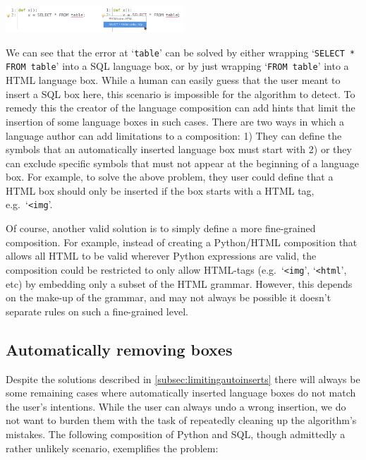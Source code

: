 \documentclass[sigplan,screen]{acmart}\settopmatter{printfolios=true,printccs=false,printacmref=false}
\newcommand{\qtt}[1]{`\texttt{#1}'\xspace}
\begin{document}
\begin{center}
\includegraphics[width=0.5\textwidth]{images/auto_html.png}
\end{center}

We can see that the error at \qtt{table} can be solved by either wrapping
\qtt{SELECT * FROM table} into a SQL language box, or by just wrapping
\qtt{FROM table} into a HTML language box. While a human can easily guess
that the user meant to insert a SQL box here, this scenario is impossible for the
algorithm to detect. To remedy this the creator of the language composition can add hints that
limit the insertion of some language boxes in such cases.   There are two ways in which
a language author can add limitations to a composition: 1) They can define
the symbols that an automatically inserted language box must start with 2)
or they can exclude specific symbols that must not appear at the beginning of a
language box. For example, to solve the above problem, they user could define
that a HTML box should only be inserted if the box starts with a HTML tag,
e.g.~\qtt{<img}.

Of course, another valid solution is to simply define a more
fine-grained composition. For example, instead of creating a Python/HTML
composition that allows all HTML to be valid wherever Python expressions are
valid, the composition could be restricted to only allow HTML-tags
(e.g.~\qtt{<img}, \qtt{<html}, etc) by embedding only a subset of the HTML
grammar. However, this depends on the make-up of the grammar, and may not
always be possible it doesn't separate rules on such a fine-grained
level.

\subsection{Automatically removing boxes}
\label{subsec_autoremoval}

Despite the solutions described in \ref{subsec:limitingautoinserts} there
will always be some remaining cases where automatically inserted language boxes do not match the
user's intentions. While the user can always undo a wrong insertion,
we do not want to burden them with the task of repeatedly
cleaning up the algorithm's mistakes. The following composition of Python and
SQL, though admittedly a rather unlikely scenario, exemplifies the problem:
\end{document}
